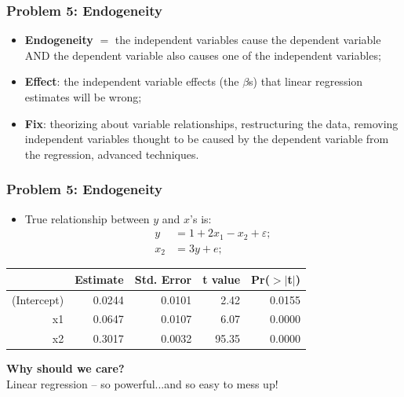 \documentclass[aspectratio=169]{beamer}
\theoremstyle{principle}
\begin{document}
\begin{frame}
\frametitle{Problem 5: Endogeneity}

\begin{itemize}
\item \textbf{Endogeneity} $=$ the independent variables cause the dependent variable AND the dependent variable also causes one of the independent variables;
\bigskip
\bigskip

\item \textbf{Effect}: the independent variable effects (the $\beta$s) that linear regression estimates will be wrong;
\bigskip
\bigskip

\item \textbf{Fix}: theorizing about variable relationships, restructuring the data, removing independent variables thought to be caused by the dependent variable from the regression, advanced techniques.

\end{itemize}

\end{frame}

\begin{frame}
\frametitle{Problem 5: Endogeneity}

\begin{itemize}
\item True relationship between $y$ and $x$'s is:
\begin{align*}
y &= 1 + 2x_1 - x_2 + \varepsilon;\\
x_ 2 &= 3y + e;
\end{align*}
\end{itemize}

\begin{table}[ht]
\centering
\begin{tabular}{rrrrr}
  \hline
  \hline
 & Estimate & Std. Error & t value & Pr($>$$|$t$|$) \\ 
  \hline
    \hline
(Intercept) & 0.0244 & 0.0101 & 2.42 & 0.0155 \\ 
  x1 & 0.0647 & 0.0107 & 6.07 & 0.0000 \\ 
  x2 & 0.3017 & 0.0032 & 95.35 & 0.0000 \\ 
   \hline
      \hline
\end{tabular}
\end{table}

\end{frame}

\begin{frame}

\begin{center}
\Huge\textbf{Why should we care?}\\
\bigskip
\bigskip
\large Linear regression -- so powerful...and so easy to mess up!\\
\end{center}

\end{frame}
\end{document}
